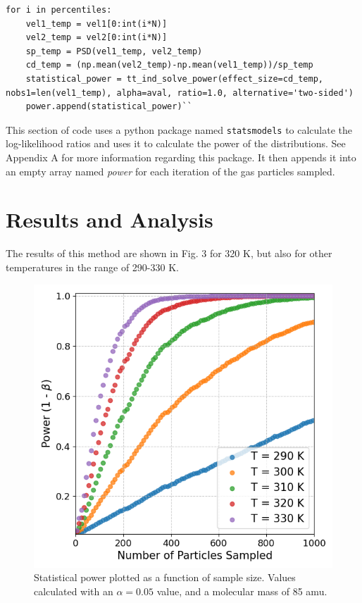 \documentclass[%
 reprint,
 amsmath,amssymb,
 aps,
]{revtex4-2}
\begin{document}
\begin{lstlisting}
for i in percentiles:
	vel1_temp = vel1[0:int(i*N)]
	vel2_temp = vel2[0:int(i*N)]
	sp_temp = PSD(vel1_temp, vel2_temp)
	cd_temp = (np.mean(vel2_temp)-np.mean(vel1_temp))/sp_temp
	statistical_power = tt_ind_solve_power(effect_size=cd_temp, nobs1=len(vel1_temp), alpha=aval, ratio=1.0, alternative='two-sided')
	power.append(statistical_power)``
\end{lstlisting}
This section of code uses a python package named \lstinline{statsmodels} to calculate the log-likelihood ratios and uses it to calculate the power of the distributions. See Appendix A for more information regarding this package. It then appends it into an empty array named \textit{power} for each iteration of the gas particles sampled.

\section{Results and Analysis}

The results of this method are shown in Fig. 3 for 320 K, but also for other temperatures in the range of 290-330 K.

\begin{figure}[h]
	\caption{Statistical power plotted as a function of sample size. Values calculated with an $\alpha = 0.05$ value, and a molecular mass of 85 amu.}
	\centering
	\includegraphics[scale=0.51]{results1.png}
\end{figure}
\end{document}
